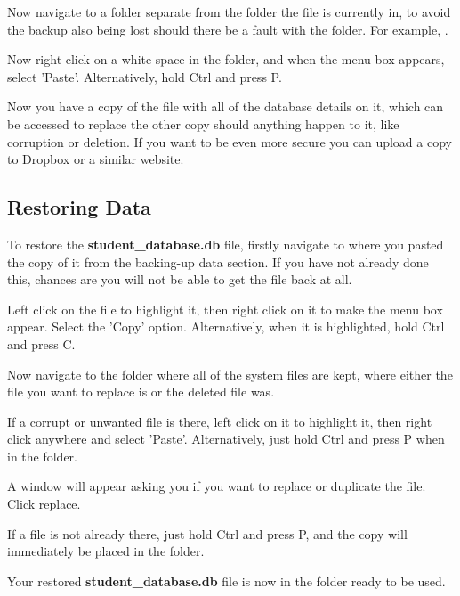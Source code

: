 Now navigate to a folder separate from the folder the file is currently in, to avoid the backup also being lost should there be a fault with the folder. For example, {}.


Now right click on a white space in the folder, and when the menu box appears, select 'Paste'.  Alternatively, hold Ctrl and press P.


Now you have a copy of the file with all of the database details on it, which can be accessed to replace the other copy should anything happen to it, like corruption or deletion. If you want to be even more secure you can upload a copy to Dropbox or a similar website.

\subsection{Restoring Data}

To restore the \textbf{student\_database.db} file, firstly navigate to where you pasted the copy of it from the backing-up data section. If you have not already done this, chances are you will not be able to get the file back at all.


Left click on the file to highlight it, then right click on it to make the menu box appear. Select the 'Copy' option. Alternatively, when it is highlighted, hold Ctrl and press C.


Now navigate to the folder where all of the system files are kept, where either the file you want to replace is or the deleted file was.


If a corrupt or unwanted file is there, left click on it to highlight it, then right click anywhere and select 'Paste'.  Alternatively, just hold Ctrl and press P when in the folder.


A window will appear asking you if you want to replace or duplicate the file. Click replace.


If a file is not already there, just hold Ctrl and press P, and the copy will immediately be placed in the folder.


Your restored \textbf{student\_database.db} file is now in the folder ready to be used.


